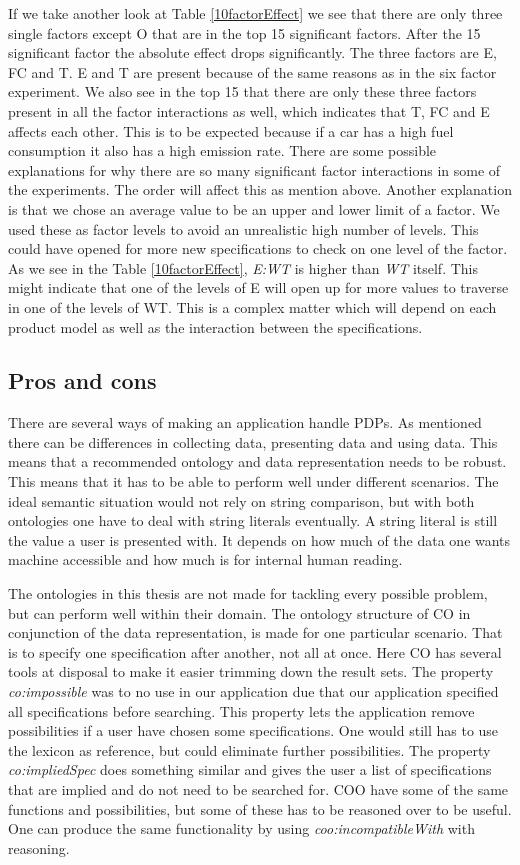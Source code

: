 \documentclass{llncs}
\begin{document}
If we take another look at Table \ref{10factorEffect} we see that
there are only three single factors except O that are in the top 15
significant factors.  After the 15 significant factor the absolute
effect drops significantly. The three factors are E, FC and T. E and T
are present because of the same reasons as in the six factor
experiment. We also see in the top 15 that there are only these three
factors present in all the factor interactions as well, which
indicates that T, FC and E affects each other. This is to be expected
because if a car has a high fuel consumption it also has a high
emission rate. There are some possible explanations for why there are
so many significant factor interactions in some of the
experiments. The order will affect this as mention above. Another
explanation is that we chose an average value to be an upper and lower
limit of a factor. We used these as factor levels to avoid an
unrealistic high number of levels. This could have opened for more new
specifications to check on one level of the factor.  As we see in the
Table \vref{10factorEffect}, \textit{E:WT} is higher than \textit{WT}
itself. This might indicate that one of the levels of E will open up
for more values to traverse in one of the levels of WT. This is a
complex matter which will depend on each product model as well as the
interaction between the specifications.

\subsection{Pros and cons}
There are several ways of making an application handle PDPs. As
mentioned there can be differences in collecting data, presenting data
and using data. This means that a recommended ontology and data
representation needs to be robust. This means that it has to be able
to perform well under different scenarios.  The ideal semantic
situation would not rely on string comparison, but with both
ontologies one have to deal with string literals eventually. A string
literal is still the value a user is presented with.  It depends on
how much of the data one wants machine accessible and how much is for
internal human reading.

The ontologies in this thesis are not made for tackling every possible
problem, but can perform well within their domain. The ontology
structure of CO in conjunction of the data representation, is made for
one particular scenario. That is to specify one specification after
another, not all at once. Here CO has several tools at disposal to
make it easier trimming down the result sets. The property
\textit{co:impossible} was to no use in our application due that our
application specified all specifications before searching. This
property lets the application remove possibilities if a user have
chosen some specifications. One would still has to use the lexicon as
reference, but could eliminate further possibilities. The property
\textit{co:impliedSpec} does something similar and gives the user a
list of specifications that are implied and do not need to be searched
for.  COO have some of the same functions and possibilities, but some
of these has to be reasoned over to be useful. One can produce the
same functionality by using \textit{coo:incompatibleWith} with
reasoning.
\end{document}
